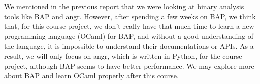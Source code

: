 We mentioned in the previous report that we were looking at binary analysis
tools like BAP and angr. However, after spending a few weeks on BAP, we think
that, for this course project, we don't really have that much time to learn a
new programming language (OCaml) for BAP, and without a good understanding of
the language, it is impossible to understand their documentations or APIs. As a
result, we will only focus on angr, which is written in Python, for the course
project, although BAP seems to have better performance. We may explore more
about BAP and learn OCaml properly after this course.
